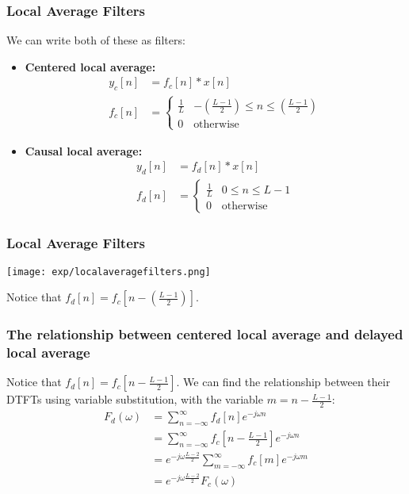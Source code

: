 \documentclass{beamer}
\begin{document}
\begin{frame}
  \frametitle{Local Average Filters}

  We can write both of these as filters:
  \begin{itemize}
  \item {\bf Centered local average:}
    \begin{align*}
      y_c[n] &= f_c[n]\ast x[n]\\
      f_c[n] &= \begin{cases} \frac{1}{L}& -\left(\frac{L-1}{2}\right)\le n\le\left(\frac{L-1}{2}\right)\\
        0&\mbox{otherwise}\end{cases}
    \end{align*}
  \item {\bf Causal local average:}
    \begin{align*}
      y_d[n] &= f_d[n]\ast x[n]\\
      f_d[n] &= \begin{cases} \frac{1}{L}& 0\le n\le L-1\\
        0&\mbox{otherwise}\end{cases}
    \end{align*}
  \end{itemize}
\end{frame}

\begin{frame}
  \frametitle{Local Average Filters}
  \centerline{\texttt{[image: exp/localaveragefilters.png]}}
  Notice that $f_d[n]=f_c\left[n-\left(\frac{L-1}{2}\right)\right]$.
\end{frame}  

\begin{frame}
  \frametitle{The relationship between centered local average and delayed local average}

  Notice that $f_d[n]=f_c[n-\frac{L-1}{2}]$.  We can find the
  relationship between their DTFTs using variable substitution, with
  the variable $m=n-\frac{L-1}{2}$:
  \begin{align*}
    F_d(\omega) &= \sum_{n=-\infty}^\infty f_d[n]e^{-j\omega n}\\
    &=\sum_{n=-\infty}^\infty f_c[n-\frac{L-1}{2}]e^{-j\omega n}\\
    &=e^{-j\omega\frac{L-2}{2}}\sum_{m=-\infty}^\infty f_c[m]e^{-j\omega m}\\
    &=e^{-j\omega\frac{L-2}{2}}F_c(\omega)
  \end{align*}
\end{frame}
  
\end{document}

